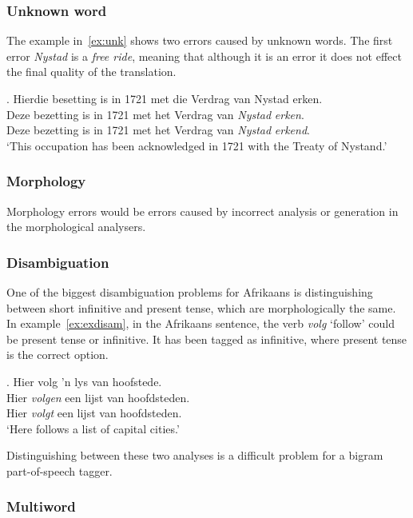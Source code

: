 \documentclass[11pt]{article}
\begin{document}
\subsubsection{Unknown word}

The example in~\ref{ex:unk} shows two errors caused by unknown words. The first error {\em Nystad} 
is a {\em free ride}, meaning that although it is an error it does not effect the final quality
of the translation. 

\ex. \label{ex:unk} 
    Hierdie besetting is in 1721 met die Verdrag van Nystad erken. \\
    Deze bezetting is in 1721 met het Verdrag van {\em *Nystad} {\em *erken}. \\
    Deze bezetting is in 1721 met het Verdrag van {\em Nystad} {\em erkend}. \\
    `This occupation has been acknowledged in 1721 with the Treaty of Nystand.'

\subsubsection{Morphology}

Morphology errors would be errors caused by incorrect analysis or generation in the morphological analysers.

\subsubsection{Disambiguation}

One of the biggest disambiguation problems for Afrikaans is distinguishing between short infinitive and present 
tense, which are morphologically the same. In example~\ref{ex:exdisam}, in the Afrikaans sentence, the verb 
{\em volg} `follow' could be present tense or infinitive. It has been tagged as infinitive, where present tense 
is the correct option.

\ex. \label{ex:exdisam} 
    Hier volg 'n lys van hoofstede. \\
    Hier {\em volgen} een lijst van hoofdsteden. \\
    Hier {\em volgt} een lijst van hoofdsteden.  \\
   `Here follows a list of capital cities.'

Distinguishing between these two analyses is a difficult problem for a bigram part-of-speech tagger.

\subsubsection{Multiword}
\end{document}
